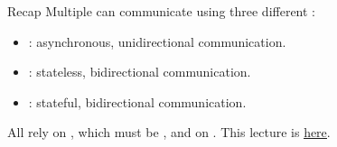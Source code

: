 
\begin{frame}{Recap}
  Multiple  can communicate using three different :
  \begin{itemize}
    \item {}: asynchronous, unidirectional communication.
    \item {}: stateless, bidirectional communication.
    \item {}: stateful, bidirectional communication.
  \end{itemize}
  All rely on , which must be , and on .
  \newline\newline
  \newline\newline
  This lecture is \href{https://github.com/robmasocco/DAFN23_Robotics_4}{\color{blue}\underline{here}}.
\end{frame}
